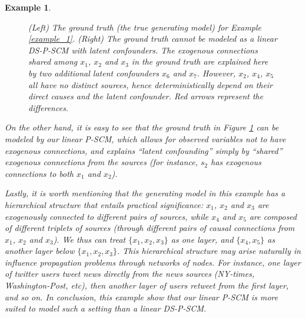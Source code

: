 \documentclass[12pt]{article}
\newtheorem{example}{Example}
\begin{document}
\begin{example}
\begin{figure}[t]

\caption{(Left) The ground truth (the true generating model) for Example \ref{example_1}. (Right) The ground truth cannot be modeled as a linear DS-P-SCM with latent confounders. The exogenous connections shared among $x_1$, $x_2$ and $x_3$ in the ground truth are explained here by two additional latent confounders $x_6$ and $x_7$. However, $x_2$, $x_4$, $x_5$ all have no distinct sources, hence deterministically depend on their direct causes and the latent confounder. Red arrows represent the differences.
}
\label{fig:example1}
\end{figure}

On the other hand, it is easy to see that the ground truth in Figure \ref{fig:example1} can be modeled by our linear P-SCM, which allows for observed variables not to have exogenous connections, and explains ``latent confounding'' simply by ``shared'' exogenous connections from the sources (for instance, $s_2$ has exogenous connections to both $x_1$ and $x_2$). 

Lastly, it is worth mentioning that the generating model in this example has a hierarchical structure that entails practical significance: $x_1$, $x_2$ and $x_3$ are exogenously connected to different pairs of sources, while $x_4$ and $x_5$ are composed of different triplets of sources (through different pairs of causal connections from $x_1$, $x_2$ and $x_3$). We thus can treat $\{x_1, x_2,x_3\}$ as one layer, and $\{x_4,x_5\}$ as another layer below $\{x_1,x_2,x_3\}$. This hierarchical structure may arise naturally in influence propagation problems through networks of nodes. For instance, one layer of twitter users tweet news directly from the news sources (NY-times, Washington-Post, etc), then another layer of users retweet from the first layer, and so on. In conclusion, this example show that our linear P-SCM is more suited to model such a setting than a linear DS-P-SCM. 


\end{example}
\end{document}
